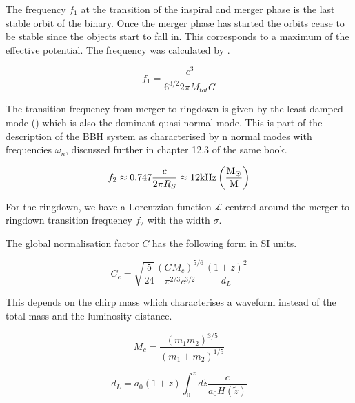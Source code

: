 The frequency $f_1$ at the transition of the inspiral and merger phase is the last stable orbit of the binary. Once the merger phase has started the orbits cease to be stable since the objects start to fall in. This corresponds to a maximum of the effective potential. The frequency was calculated by \cite{bardeen_rotating_1972}.

\begin{equation}
    f_1 = \frac{c^3}{6^{3/2}2\pi M_{tot} G}
\end{equation}

The transition frequency from merger to ringdown is given by the least-damped mode (\cite{maggiore_gravitational_2008}) which is also the dominant quasi-normal mode. This is part of the description of the BBH system as characterised by n normal modes with frequencies $\omega_n$, discussed further in chapter 12.3 of the same book.

\begin{equation}
    f_2 \approx 0.747 \frac{c}{2\pi R_S} \approx 12 \rm{kHz} \left( \frac{M_\odot}{M}\right)
\end{equation}

For the ringdown, we have a Lorentzian function $\mathcal{L}$ centred around the merger to ringdown transition frequency $f_2$ with the width $\sigma$.

The global normalisation factor $C$ has the following form in SI units.

\begin{equation}
    C_e = \sqrt{\frac{5}{24}}\frac{(GM_c)^{5/6}}{\pi^{2/3}c^{3/2}}\frac{(1+z)^2}{d_L}
\end{equation}

This depends on the chirp mass which characterises a waveform instead of the total mass and the luminosity distance.

\begin{equation}
    M_c = \frac{(m_1m_2)^{3/5}}{(m_1+m_2)^{1/5}}
\end{equation}

\begin{equation}
    d_L = a_0 (1+z)\int_0^z d\tilde{z}\frac{c}{a_0 H(\tilde{z})}
\end{equation}

